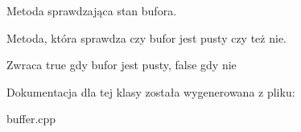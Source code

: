 Metoda sprawdzająca stan bufora. 

Metoda, która sprawdza czy bufor jest pusty czy też nie. \begin{DoxyReturn}{Zwraca}
true gdy bufor jest pusty, false gdy nie 
\end{DoxyReturn}


Dokumentacja dla tej klasy została wygenerowana z pliku\+:\begin{DoxyCompactItemize}
\item 
buffer.\+cpp\end{DoxyCompactItemize}
